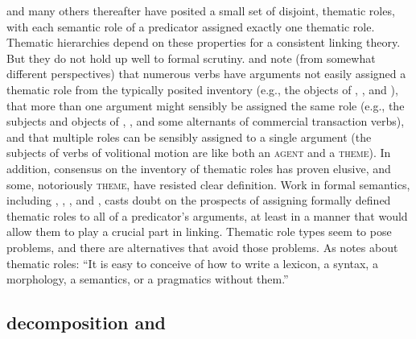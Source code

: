 \documentclass[output=paper
                ,modfonts
                ,nonflat
	        ,collection
	        ,collectionchapter
	        ,collectiontoclongg
 	        ,biblatex
                ,babelshorthands
                ,newtxmath
                ,draftmode
                ,colorlinks, citecolor=brown
]{./langsci/langscibook}
\begin{document}
\citet{Fillmore1968} and many others thereafter have posited a small set of disjoint, thematic roles, with each semantic role of a predicator assigned exactly one thematic role.
Thematic hierarchies depend on these properties for a consistent linking theory.
But they do not hold up well to formal scrutiny.
\citet{Jackendoff1987} and \citet{Dowty1991} note (from somewhat different perspectives) that numerous verbs have arguments not easily assigned a thematic role from the typically posited inventory (e.g., the objects of , , and ), that more than one argument might sensibly be assigned the same role (e.g., the subjects and objects of , , and some alternants of commercial transaction verbs), and that multiple roles can be sensibly assigned to a single argument (the subjects of verbs of volitional motion are like both an \textsc{agent} and a \textsc{theme}).
In addition, consensus on the inventory of thematic roles has proven elusive, and some, notoriously \textsc{theme}, have resisted clear definition.
Work in formal semantics, including \citet{LadusawandDowty1988}, \citet{Dowty1989}, \citet{Landman2000}, and \cite{Schein2002}, casts doubt on the prospects of assigning formally defined thematic roles to all of a predicator's arguments, at least in a manner that would allow them to play a crucial part in linking.
Thematic role types seem to pose problems, and there are alternatives that avoid those problems.  As \citet{Carlson1998} notes about thematic roles: ``It is easy to conceive of how to write a lexicon, a syntax, a morphology, a semantics, or a pragmatics without them.''

%


\subsection{\content decomposition and \argst}
%
%
%
\end{document}
